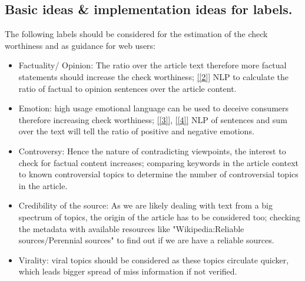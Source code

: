\documentclass[10pt]{article}
\begin{document}
\subsection{Basic ideas \& implementation ideas for labels.}
The following labels should be considered for the estimation of the check worthiness and as guidance for web users:
\begin{itemize}
\item Factuality/ Opinion: The ratio over the article text therefore more factual statements should increase the check worthiness;
\ref{[2]} NLP to calculate the ratio of factual to opinion sentences over the article content.
\item Emotion: high usage emotional language can be used to deceive consumers therefore increasing check worthiness;
\ref{[3]}, \ref{[4]} NLP of sentences and sum over the text will tell the ratio of positive and negative emotions.
\item Controversy: Hence the nature of contradicting viewpoints, the interest to check for factual content increases;
comparing keywords in the article context to known controversial topics to determine the number of controversial topics in the article.
\item Credibility of the source: As we are likely dealing with text from a big spectrum of topics, the origin of the article has to be considered too; checking the metadata with available resources like "Wikipedia:Reliable sources/Perennial sources" to find out if we are have a reliable sources.
\item Virality: viral topics should be considered as these topics circulate quicker, which leads bigger spread of miss information if not verified.
\end{itemize}


\end{document}
